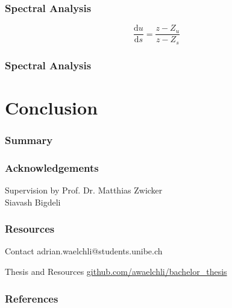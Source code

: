 \documentclass[12pt, compress]{beamer}
\begin{document}
\begin{frame}[fragile]
	\frametitle{Spectral Analysis}
	
	\begin{center}
		
		\hspace{1cm}
		
	\end{center}
	
	\begin{equation*}
		\frac{\text{d}u}{\text{d}s} = \frac{z - Z_u}{z - Z_s}
	\end{equation*}
	
\end{frame}

\begin{frame}[fragile]
	\frametitle{Spectral Analysis}
	
	\begin{center}
		
		\hspace{1cm}
		
	\end{center}
	
	
\end{frame}

\section{Conclusion}

\begin{frame}[fragile]
	\frametitle{Summary}
	
\end{frame}

\begin{frame}
	\frametitle{Acknowledgements}
	
	\begin{block}{Supervision by}
		Prof. Dr. Matthias Zwicker \\
		Siavash Bigdeli
	\end{block}
\end{frame}

\begin{frame}[fragile]
	\frametitle{Resources}
	
	\begin{block}{Contact}
  		adrian.waelchli@students.unibe.ch
	\end{block}
	
	\begin{block}{Thesis and Resources}
		\href{https://github.com/awaelchli/bachelor_thesis}{github.com/awaelchli/bachelor\_thesis}
	\end{block}
\end{frame}

\begin{frame}
	\frametitle{References}
	
	
%	
	\def\bibfont{\scriptsize}
	
\end{frame}
\end{document}
